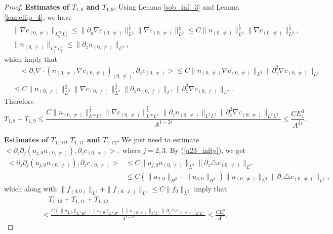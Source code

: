 \documentclass[10pt,a4paper]{amsart}
\begin{document}
\begin{proof}
		
		{\bf  Estimates of $T_{1,8}$ and $T_{1,9}$.}
		Using Lemma \ref{sob_inf_3} and Lemma \ref{lem:ellip_4},
		we have
		\begin{equation*}
			\begin{aligned}
				&\|\nabla c_{(0,\neq)}\|_{L^{\infty}_yL^2_z}
				\leq \|\partial_y\nabla c_{(0,\neq)}\|_{L^2}^{\frac12}
				\|\nabla c_{(0,\neq)}\|_{L^2}^{\frac12}
				\leq C\|n_{(0,\neq)}\|_{L^2}^{\frac12}
				\|\nabla c_{(0,\neq)}\|_{L^2}^{\frac12},\\
				&\|n_{(0,\neq)}\|_{L^{\infty}_zL^2_y}\leq 
				\|\partial_zn_{(0,\neq)}\|_{L^2},
			\end{aligned}
		\end{equation*}
		which imply that
		\begin{align*}
			&\quad <\partial_z\nabla\cdot(n_{(0,\neq)}\nabla c_{(0,\neq)})_{(0,\neq)},\partial_z
			c_{(0,\neq)}>\leq C
			\|n_{(0,\neq)}\nabla c_{(0,\neq)}\|_{L^2}
			\|\partial_z^2\nabla c_{(0,\neq)}\|_{L^2}\\
			&\leq C\|n_{(0,\neq)}\|_{L^2}^{\frac12}
			\|\nabla c_{(0,\neq)}\|_{L^2}^{\frac12}
			\|\partial_zn_{(0,\neq)}\|_{L^2}
			\|\partial_z^2\nabla c_{(0,\neq)}\|_{L^2}.
		\end{align*}
		Therefore
		\begin{equation*}
			T_{1,8}+T_{1,9}\leq 
			\frac{C\|n_{(0,\neq)}\|_{L^{\infty}L^2}^{\frac12}
				\|\nabla c_{(0,\neq)}\|_{L^{\infty}L^2}^{\frac12}
				\|\partial_zn_{(0,\neq)}\|_{L^2L^2}
				\|\partial_z^2\nabla c_{(0,\neq)}\|_{L^2L^2}}{A^{1-2\epsilon}}
			\leq \frac{CE_1^3}{ A^{\frac{1}{2}\epsilon}}.
		\end{equation*}
		
		{\bf Estimates of $T_{1,10}$, $T_{1,11}$ and $T_{1,12}$.}
		We just need to estimate  $<\partial_z\partial_j (u_{j,0}n_{(0,\neq)}),
		\partial_zc_{(0,\neq)}>,$ where $j=2,3.$
		By (\ref{u23_infty}), we get
		\begin{equation*}
			\begin{aligned}
				<\partial_z\partial_j (u_{j,0}n_{(0,\neq)}),
				\partial_zc_{(0,\neq)}>
				&\leq
				C\|u_{j,0}n_{(0,\neq)}\|_{L^2}
				\|\partial_z\triangle c_{(0,\neq)}\|_{L^2}\\
				&\leq C(\|u_{2,0}\|_{H^2}+\|u_{3,0}\|_{H^1})
				\|n_{(0,\neq)}\|_{L^2}
				\|\partial_z\triangle c_{(0,\neq)}\|_{L^2},	
			\end{aligned}
		\end{equation*}
		which along with $\|f_{(0,0)}\|_{L^2}+
		\|f_{(0,\neq)}\|_{L^2}\leq C\|f_{0}\|_{L^2}$ imply that 
		\begin{equation*}
			\begin{aligned}
				&\quad T_{1,10}+T_{1,11}+T_{1,12}\\
				&\leq
				\frac{C(\|u_{2,0}\|_{L^{\infty}H^2}+\|u_{3,0}\|_{L^{\infty}H^1})
					\|n_{(0,\neq)}\|_{L^2L^2}
					\|\partial_z\triangle c_{(0,\neq)}\|_{L^2L^2}}{A^{1-2\epsilon}}
				\leq \frac{CE_1^3}{ A^{\epsilon}}.		
			\end{aligned}
		\end{equation*}
		

\end{proof}
\end{document}

